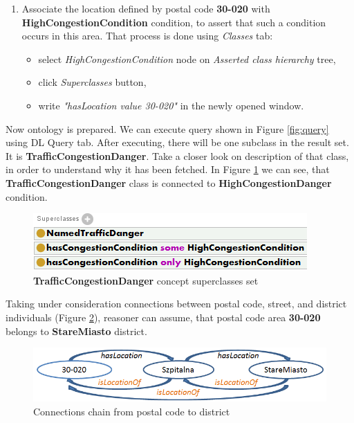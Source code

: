 \begin{enumerate}
\begin{itemize}
    \end{itemize}

    \item Associate the location defined by postal code \textbf{30-020} with \textbf{HighCongestionCondition} condition, to assert that such a condition occurs in this area. That process is done using \textit{Classes} tab:
    \begin{itemize}
        \setlength{\itemsep}{0cm}
        \setlength{\parskip}{0cm}

        \item select \textit{HighCongestionCondition} node on \textit{Asserted class hierarchy} tree,
        \item click \textit{Superclasses} button,
        \item write \textit{"hasLocation value 30-020"} in the newly opened window.
    \end{itemize}

\end{enumerate}

\noindent Now ontology is prepared. We can execute query shown in Figure \ref{fig:query} using DL Query tab. After executing, there will be one subclass in the result set. It is \textbf{TrafficCongestionDanger}. Take a closer look on description of that class, in order to understand why it has been fetched. In Figure \ref{fig:trafficCongestionDanger} we can see, that \textbf{TrafficCongestionDanger} class is connected to \textbf{HighCongestionDanger} condition.

\newpage

\begin{figure}[htp]
\centering
\includegraphics[scale=0.7]{images/chapter3/TrafficCongestionDanger}
\caption{\textbf{TrafficCongestionDanger} concept superclasses set}
\label{fig:trafficCongestionDanger}
\end{figure}

\noindent Taking under consideration connections between postal code, street, and district individuals (Figure \ref{fig:connection}), reasoner can assume, that postal code area \textbf{30-020} belongs to \textbf{StareMiasto} district. 

\medskip

\begin{figure}[htp]
\centering
\includegraphics[scale=0.6]{images/chapter3/Connection}
\caption{Connections chain from postal code to district}
\label{fig:connection}
\end{figure}

